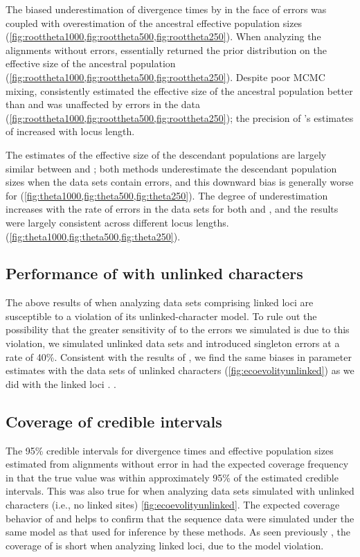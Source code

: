 The biased underestimation of divergence times by \ecoevolity in the face of
errors was coupled with overestimation of the ancestral effective population
sizes (\cref{fig:roottheta1000,fig:roottheta500,fig:roottheta250}).
When analyzing the alignments without errors, \ecoevolity essentially returned
the prior distribution on the effective size of the ancestral population
(\cref{fig:roottheta1000,fig:roottheta500,fig:roottheta250}).
Despite poor MCMC mixing, \beast consistently estimated the effective size of
the ancestral population better than \ecoevolity and was unaffected by errors
in the data
(\cref{fig:roottheta1000,fig:roottheta500,fig:roottheta250});
the precision of \beast's estimates of \rootpopsize increased with locus
length.

The estimates of the effective size of the descendant populations
are largely similar between \beast and \ecoevolity;
both methods underestimate the descendant population sizes when
the data sets contain errors, and this downward bias is generally
worse for \ecoevolity
(\cref{fig:theta1000,fig:theta500,fig:theta250}).
The degree of underestimation increases with the rate of errors in the data
sets for both \beast and \ecoevolity, and the results were largely consistent
across different locus lengths.
(\cref{fig:theta1000,fig:theta500,fig:theta250}).

\subsection{Performance of \ecoevolity with unlinked characters}
The above results of \ecoevolity when analyzing data sets comprising linked
loci are susceptible to a violation of its unlinked-character model.
To rule out the possibility that the greater sensitivity of \ecoevolity to the
errors we simulated is due to this violation, we simulated unlinked data sets
and introduced singleton errors at a rate of 40\%.
Consistent with the results of \citet{Oaks2018ecoevolity}, we find the same
biases in parameter estimates with the data sets of unlinked characters
(\cref{fig:ecoevolityunlinked}) as we did with the linked loci \timefigsp.
.

\subsection{Coverage of credible intervals}
The 95\% credible intervals for divergence times and effective population sizes
estimated from alignments without error in \beast had the expected coverage
frequency in that the true value was within approximately 95\% of the estimated
credible intervals. 
This was also true for \ecoevolity when analyzing data sets simulated with
unlinked characters (i.e., no linked sites) \cref{fig:ecoevolityunlinked}.
The expected coverage behavior of \beast and \ecoevolity helps to confirm that
the sequence data were simulated under the same model as that used for
inference by these methods. 
As seen previously \citep{Oaks2018ecoevolity}, the coverage of \ecoevolity is
short when analyzing linked loci, due to the model violation.



